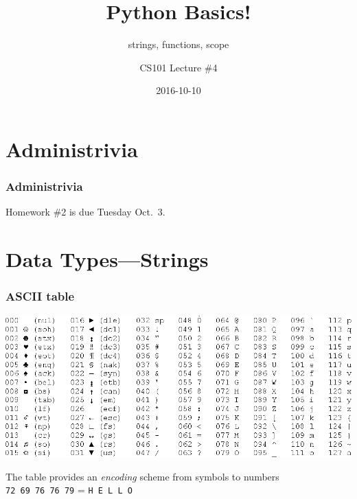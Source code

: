 \documentclass[11pt]{beamer}
\title{Python Basics!}
\subtitle{strings, functions, scope}
\author{CS101 Lecture \#4}
\date{2016-10-10}
\begin{document}
  \setcounter{showProgressBar}{0}
  \setcounter{showSlideNumbers}{0}

\frame{\titlepage}

\setcounter{framenumber}{0}
\setcounter{showProgressBar}{1}
\setcounter{showSlideNumbers}{1}

\section{Administrivia}

\begin{frame}
  \frametitle{Administrivia}
  \Enlarge
  \begin{itemize}
  \myitem  Homework \#2 is due Tuesday Oct.\ 3. 
  \end{itemize}
\end{frame}


\section{Data Types---Strings}

\begin{frame}
  \frametitle{ASCII table}
  \Enlarge
  \includegraphics[width=\textwidth]{./img/ascii-table.png} \\ \pause
  
  {\small The table provides an \emph{encoding} scheme from symbols to numbers} \\
  \texttt{72 69 76 76 79} = \texttt{H E L L O} %
  
\end{frame}
\end{document}
